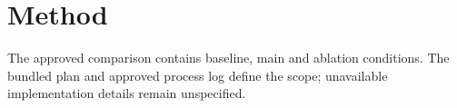 \section{Method}
The approved comparison contains baseline, main and ablation conditions.
The bundled plan and approved process log define the scope; unavailable implementation details remain unspecified.
